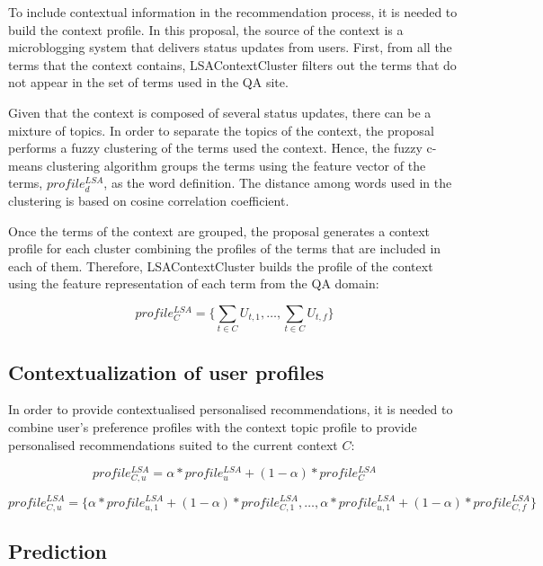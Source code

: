 \documentclass[preprint]{elsarticle}
\begin{document}
\begin{spacing}{1.5}
To include contextual information in the recommendation process, it is needed to build the context profile. In this proposal, the source of the context is a microblogging system that delivers status updates from users. First, from all the terms that the context contains, LSAContextCluster filters out the terms that do not appear in the set of terms used in the QA site.

Given that the context is composed of several status updates, there can be a mixture of topics. In order to separate the topics of the context, the proposal performs a fuzzy clustering of the terms used the context. Hence, the fuzzy c-means clustering algorithm groups the terms using the feature vector of the terms, $profile^{LSA}_d$, as the word definition. The distance among words used in the clustering is based on cosine correlation coefficient.

Once the terms of the context are grouped, the proposal generates a context profile for each cluster combining the profiles of the terms that are included in each of them. Therefore, LSAContextCluster builds the profile of the context using the feature representation of each term from the QA domain:

\begin{equation}
	profile^{LSA}_{C} = \{\sum_{t \in C} U_{t,1}, \dots, \sum_{t \in C} U_{t,f} \}
\end{equation}

\subsection{Contextualization of user profiles}

In order to provide contextualised personalised recommendations, it is needed to combine user's preference profiles with the context topic profile to provide personalised recommendations suited to the current context $C$:

\begin{equation}
	profile^{LSA}_{C,u} = \alpha * profile^{LSA}_u + (1- \alpha )*profile^{LSA}_{C}
\end{equation}

\begin{equation}
	profile^{LSA}_{C,u} = \{ \alpha * profile^{LSA}_{u,1} + (1- \alpha ) * profile^{LSA}_{C,1},\dots, \alpha * profile^{LSA}_{u,1} + ( 1 - \alpha ) * profile^{LSA}_{C,f} \}
\end{equation}

\subsection{Prediction}


\end{spacing}
\end{document}
